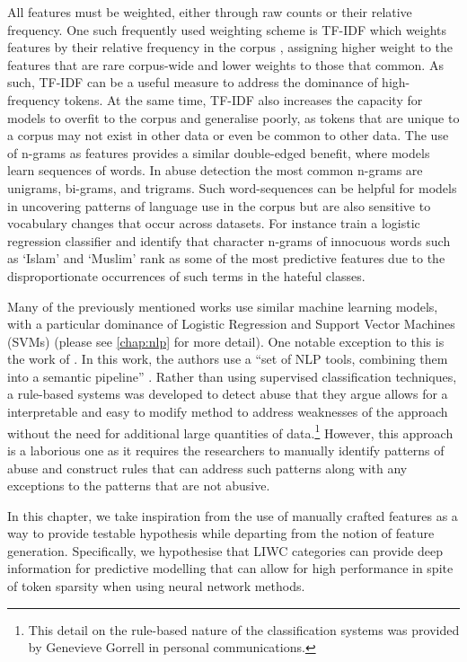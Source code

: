 All features must be weighted, either through raw counts or their relative frequency. One such frequently used weighting scheme is TF-IDF which weights features by their relative frequency in the corpus \citep{Fortuna:2018}, assigning higher weight to the features that are rare corpus-wide and lower weights to those that common. As such, TF-IDF can be a useful measure to address the dominance of high-frequency tokens. At the same time, TF-IDF also increases the capacity for models to overfit to the corpus and generalise poorly, as tokens that are unique to a corpus may not exist in other data or even be common to other data. The use of n-grams as features provides a similar double-edged benefit, where models learn sequences of words. In abuse detection the most common n-grams are unigrams, bi-grams, and trigrams. Such word-sequences can be helpful for models in uncovering patterns of language use in the corpus but are also sensitive to vocabulary changes that occur across datasets. For instance \citet{Waseem-Hovy:2016} train a logistic regression classifier and identify that character n-grams of innocuous words such as `Islam' and `Muslim' rank as some of the most predictive features due to the disproportionate occurrences of such terms in the hateful classes.

Many of the previously mentioned works use similar machine learning models, with a particular dominance of Logistic Regression and Support Vector Machines (SVMs) (please see \cref{chap:nlp} for more detail). One notable exception to this is the work of \citet{Gorrell:2018}. In this work, the authors use a ``set of NLP tools, combining them into a semantic pipeline'' \citep[pp. 601]{Gorrell:2018}. Rather than using supervised classification techniques, a rule-based systems was developed to detect abuse that they argue allows for a interpretable and easy to modify method to address weaknesses of the approach without the need for additional large quantities of data.\footnote{This detail on the rule-based nature of the classification systems was provided by Genevieve Gorrell in personal communications.} However, this approach is a laborious one as it requires the researchers to manually identify patterns of abuse and construct rules that can address such patterns along with any exceptions to the patterns that are not abusive.
\vspace{5mm}

In this chapter, we take inspiration from the use of manually crafted features as a way to provide testable hypothesis while departing from the notion of feature generation. Specifically, we hypothesise that LIWC categories can provide deep information for predictive modelling that can allow for high performance in spite of token sparsity when using neural network methods.


